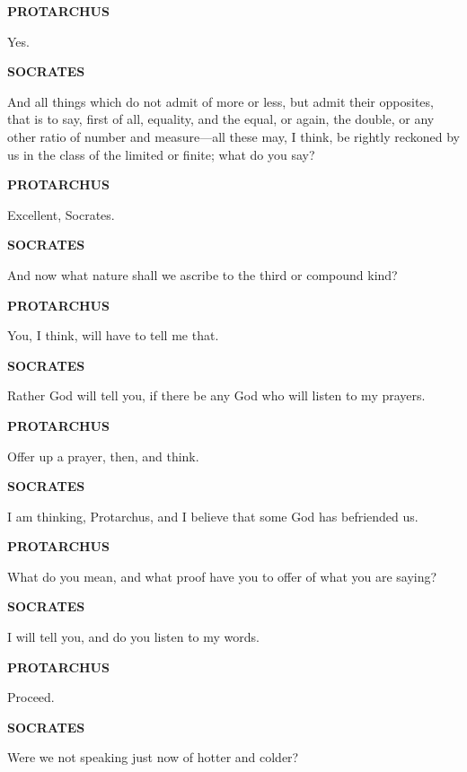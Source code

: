 \documentclass[11pt,letter]{article}
\begin{document}
\par \textbf{PROTARCHUS}
\par   Yes.

\par \textbf{SOCRATES}
\par   And all things which do not admit of more or less, but admit their opposites, that is to say, first of all, equality, and the equal, or again, the double, or any other ratio of number and measure—all these may, I think, be rightly reckoned by us in the class of the limited or finite; what do you say?

\par \textbf{PROTARCHUS}
\par   Excellent, Socrates.

\par \textbf{SOCRATES}
\par   And now what nature shall we ascribe to the third or compound kind?

\par \textbf{PROTARCHUS}
\par   You, I think, will have to tell me that.

\par \textbf{SOCRATES}
\par   Rather God will tell you, if there be any God who will listen to my prayers.

\par \textbf{PROTARCHUS}
\par   Offer up a prayer, then, and think.

\par \textbf{SOCRATES}
\par   I am thinking, Protarchus, and I believe that some God has befriended us.

\par \textbf{PROTARCHUS}
\par   What do you mean, and what proof have you to offer of what you are saying?

\par \textbf{SOCRATES}
\par   I will tell you, and do you listen to my words.

\par \textbf{PROTARCHUS}
\par   Proceed.

\par \textbf{SOCRATES}
\par   Were we not speaking just now of hotter and colder?
\end{document}
